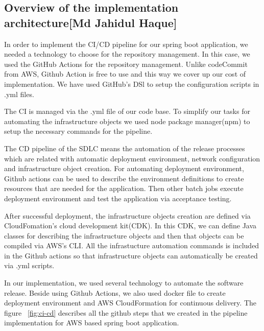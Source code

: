 \subsection{Overview of the implementation architecture[Md Jahidul Haque]}\label{sec:arch-aws}
In order to implement the CI/CD pipeline for our spring boot application, we needed a technology to choose for the repository management. In this case, we used the GitHub Actions for the repository management. Unlike codeCommit from AWS, Github Action is free to use and this way we cover up our cost of implementation. We have used GitHub's DSl to setup the configuration scripts in {{.yml}} files. 

The CI is managed via the {{.yml}} file of our code base. To simplify our tasks for automating the infrastructure objects we used node package manager(npm) to setup the necessary commands for the pipeline.

The CD pipeline of the SDLC means the automation of the release processes which are related with automatic deployment environment, network configuration and infrastructure object creation. For automating deployment environment, Github actions can be used to describe the environment definitions to create resources that are needed for the application. Then other batch jobs execute deployment environment and test the application via acceptance testing. 

After successful deployment, the infrastructure objects creation are defined via CloudFomation's  cloud development kit(CDK). In this CDK, we can define Java classes for describing the infrastructure objects and then that objects can be compiled via AWS's CLI. All the infrastucture automation commands is included in the Github actions so that infrastructure objects can automatically be created via {{.yml}} scripts.











In our implementation, we used several technology to automate the software release. Beside using Github Actions, we also used docker file to create deployment environment and AWS CloudFormation for continuous delivery. The figure ~\ref{fig:ci-cd} describes all the github steps that we created in the pipeline implementation for AWS based spring boot application.


